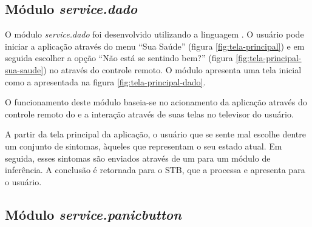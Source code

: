 \subsection{Módulo \textit{service.dado}}\label{subsec:dado}

O módulo \textit{service.dado} foi desenvolvido utilizando a linguagem 
\python[]. O usuário pode iniciar a aplicação através do menu ``Sua Saúde''
(figura \ref{fig:tela-principal}) e em seguida escolher a opção ``Não está se 
sentindo bem?'' (figura \ref{fig:tela-principal-sua-saude}) no \stb[] através do 
controle remoto. O módulo apresenta uma tela inicial como a apresentada na 
figura \ref{fig:tela-principal-dado}.

O funcionamento deste módulo baseia-se no acionamento da aplicação através
do controle remoto do \stb[] e a interação através de suas telas no televisor
do usuário. 


A partir da tela principal da aplicação, o usuário que se sente mal escolhe 
dentre um conjunto de sintomas, àqueles que representam o seu estado atual. Em
seguida, esses sintomas são enviados através de um \webservice[] para um
módulo de inferência. A conclusão é retornada para o STB, que a processa e 
apresenta para o usuário.

\subsection{Módulo \textit{service.panicbutton}}\label{subsec:panicbutton}